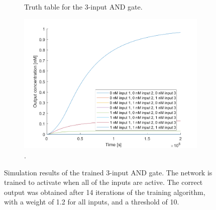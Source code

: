 \begin{figure}[H]
\begin{subfigure}[t]{.49\columnwidth}
\begin{tabular}[b]{cccc}
    \hline
    \end{tabular}
    \caption{Truth table for the 3-input AND gate.}
    \label{and_table}
\end{subfigure}
\hfill
\begin{subfigure}[t]{.49\columnwidth}
  \centering
\includegraphics[width=\linewidth]{images/and_simulation_3input.png}
\caption{.}
\label{}
\end{subfigure}
\caption{Simulation results of the trained 3-input AND gate. The network is trained to activate when all of the inputs are active. The correct output was obtained after 14 iterations of the training algorithm, with a weight of 1.2 for all inputs, and a threshold of 10.}
\end{figure}

